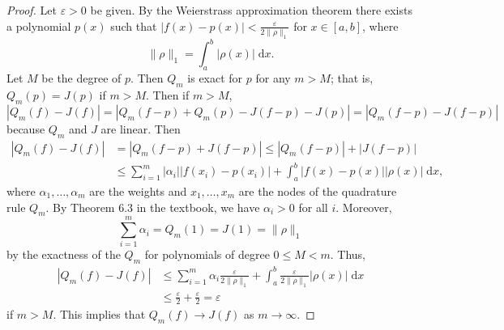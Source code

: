 \documentclass{homework}
\begin{document}
	\begin{proof}
		Let $\varepsilon > 0$ be given. By the Weierstrass approximation theorem there exists a polynomial $p(x)$ such that $|f(x) - p(x)| < \frac{\varepsilon}{2\lVert \rho\rVert_1}$ for $x \in [a,b]$, where
		\begin{equation*}
			\lVert \rho \rVert_1 = \int_a^b |\rho(x)|\;\text{d}x.
		\end{equation*}
		Let $M$ be the degree of $p$. Then $Q_m$ is exact for $p$ for any $m > M$; that is, $Q_m(p) = J(p)$ if $m > M$. Then if $m > M$,
		\begin{equation*}
			|Q_m(f) - J(f)| = |Q_m(f-p) + Q_m(p) - J(f-p) - J(p)| = |Q_m(f-p) - J(f-p)|
		\end{equation*}
		because $Q_m$ and $J$ are linear. Then
		\begin{align*}
			|Q_m(f) - J(f)| &= |Q_m(f-p) + J(f-p)| \le |Q_m(f-p)| + |J(f-p)| \\
			&\le \sum_{i=1}^m|\alpha_i||f(x_i)-p(x_i)| + \int_a^b|f(x) - p(x)||\rho(x)|\;\text{d}x,
		\end{align*}
		where $\alpha_1,\dots, \alpha_m$ are the weights and $x_1, \dots, x_m$ are the nodes of the quadrature rule $Q_m$. By Theorem 6.3 in the textbook, we have $\alpha_i > 0$ for all $i$. Moreover, \begin{equation*}
			\sum_{i=1}^m\alpha_i=Q_m(1)  = J(1) = \lVert \rho\rVert_1
		\end{equation*} 
		by the exactness of the $Q_m$ for polynomials of degree $0\le M<m$. Thus,
		\begin{align*}
			|Q_m(f) - J(f)| &\le \sum_{i=1}^m\alpha_i\frac{\varepsilon}{2\lVert \rho\rVert_1} + \int_a^b\frac{\varepsilon}{2\lVert\rho\rVert_1}|\rho(x)|\;\text{d}x \\
			&\le \frac{\varepsilon}{2} + \frac{\varepsilon}{2} = \varepsilon
		\end{align*}
		if $m > M$. This implies that $Q_m(f) \to J(f)$ as $m\to \infty$.
	\end{proof}
	
\end{document}
